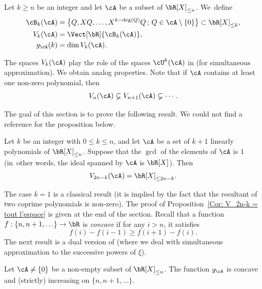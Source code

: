\begin{Def}
\label{Def: fonction g_A(N)}
Let $k\geq n$ be an integer and let $\cA$ be a subset of $\bR[X]_{\leq n}$. We~define
\begin{align*}
\cB_k(\cA) &= \big\{ Q, XQ,\dots, X^{k-\deg(Q)}Q \,;\, Q\in\cA\setminus\{0\} \big\} \subset \bR[X]_{\leq k}, \\
V_k(\cA) &= \Vect[\bR]{\cB_k(\cA)}, \\
g_\cA(k) &= \dim V_k(\cA).
\end{align*}
\end{Def}

The spaces $V_k(\cA)$ play the role of the spaces $\cU^{k}(\cA)$ in \cite[\S3]{poels2022simultaneous} (for simultaneous approximation). We obtain analog properties. Note that if $\cA$ contains at least one non-zero polynomial, then
\begin{equation}
\label{eq: suite V_k(A) strict. croissante}
V_n(\cA) \varsubsetneq V_{n+1}(\cA) \varsubsetneq\cdots.
\end{equation}

The goal of this section is to prove the following result. We could not find a reference for the proposition below.

\begin{Prop}
\label{Cor: V_2n-k = tout l'espace}
Let $k$ be an integer with $0\leq k \leq n$, and let $\cA$ be a set of $k+1$ linearly polynomials of $\bR[X]_{\leq n}$. Suppose that the $\gcd$ of the elements of $\cA$ is $1$ (in~other words, the ideal spanned by $\cA$ is $\bR[X]$). Then
\begin{equation}
\label{Cor: V_N = tout l'espace}
V_{2n-k}(\cA) = \bR[X]_{\leq 2n-k}.
\end{equation}
\end{Prop}

The case $k=1$ is a classical result (it is implied by the fact that the resultant of two coprime polynomials is non-zero). The proof of Proposition~\ref{Cor: V_2n-k = tout l'espace} is given at the end of the section. Recall that a function $f : \{n,n+1, \ldots \} \to \bR$ is \emph{concave} if for any $i > n$, it satisfies
\[
f(i)-f(i-1) \geq f(i+1)-f(i).
\]
The next result is a dual version of \cite[Prop.\,3.1]{poels2022simultaneous} (where we deal with simultaneous approximation to the successive powers of $\xi$).

\begin{Lem}
Let $\cA \neq \{0\}$ be a non-empty subset of $\bR[X]_{\leq n}$. The function $g_\cA$ is concave and (strictly) increasing on $\{n,n+1,\ldots\}$.
\end{Lem}

